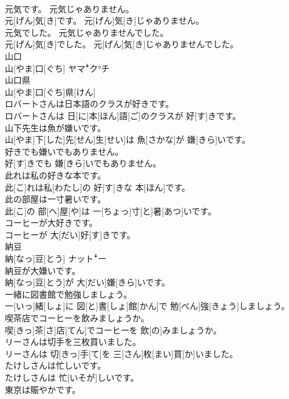\documentclass[8pt]{extreport}
\begin{document}
\begin{CJK}{UTF8}{min}
\\	元気です。 元気じゃありません。	
\\	元[げん]気[き]です。 元[げん]気[き]じゃありません。
\\	元気でした。 元気じゃありませんでした。	
\\	元[げん]気[き]でした。 元[げん]気[き]じゃありませんでした。
\\	山口	
\\	山[やま]口[ぐち]	ヤマꜜク°チ
\\	山口県	
\\	山[やま]口[ぐち]県[けん]	
\\	ロバートさんは日本語のクラスが好きです。	
\\	ロバートさんは 日[に]本[ほん]語[ご]のクラスが 好[す]きです。
\\	山下先生は魚が嫌いです。	
\\	山[やま]下[した]先[せん]生[せい]は 魚[さかな]が 嫌[きら]いです。
\\	好きでも嫌いでもありません。	
\\	好[す]きでも 嫌[きら]いでもありません。
\\	此れは私の好きな本です。	
\\	此[こ]れは私[わたし]の 好[す]きな 本[ほん]です。
\\	此の部屋は一寸暑いです。	
\\	此[こ]の 部[へ]屋[や]は 一[ちょっ]寸[と]暑[あつ]いです。
\\	コーヒーが大好きです。	
\\	コーヒーが 大[だい]好[す]きです。
\\	納豆	
\\	納[なっ]豆[とう]	ナットꜜー
\\	納豆が大嫌いです。	
\\	納[なっ]豆[とう]が 大[だい]嫌[きら]いです。
\\	一緒に図書館で勉強しましょう。	
\\	一[いっ]緒[しょ]に 図[と]書[しょ]館[かん]で 勉[べん]強[きょう]しましょう。
\\	喫茶店でコーヒーを飲みましょうか。	
\\	喫[きっ]茶[さ]店[てん]でコーヒーを 飲[の]みましょうか。
\\	リーさんは切手を三枚買いました。	
\\	リーさんは 切[きっ]手[て]を 三[さん]枚[まい]買[か]いました。
\\	たけしさんは忙しいです。	
\\	たけしさんは 忙[いそが]しいです。
\\	東京は賑やかです。	

\end{CJK}
\end{document}
